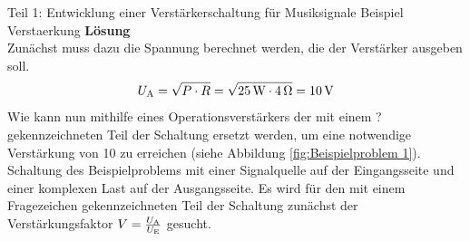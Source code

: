 \begin{frame}
{\begin{bsp}{ Teil 1: Entwicklung einer Verstärkerschaltung für Musiksignale}{ Beispiel Verstaerkung }
            \textbf{Lösung}\\
            Zunächst muss dazu die Spannung berechnet werden, die der Verstärker ausgeben soll.
            \begin{equation}
                U_{\textnormal{A}} = \sqrt{P \cdot R} = \sqrt{25\,\mathrm{W} \cdot 4\,\mathrm{\Omega}} = 10\,\textnormal{V}
            \end{equation}
            Wie kann nun mithilfe eines Operationsverstärkers der mit einem \glqq ?\grqq{} gekennzeichneten Teil der Schaltung ersetzt werden, um eine notwendige Verstärkung von 10 zu erreichen (siehe Abbildung \ref{fig:Beispielproblem 1}).
            {Schaltung des Beispielproblems mit einer Signalquelle auf der Eingangsseite und einer komplexen Last auf der Ausgangsseite. Es wird für den mit einem Fragezeichen gekennzeichneten Teil der Schaltung zunächst der Verstärkungsfaktor $V=\frac{U_{\textnormal{A}}}{U_{\textnormal{E}}}$ gesucht. \label{fig:Beispielproblem 1}}
        \end{bsp}
    }


\end{frame}

